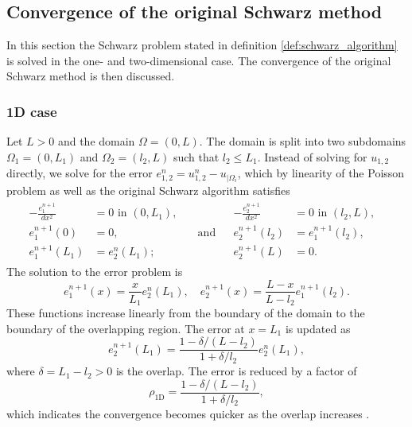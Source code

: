 \subsection{Convergence of the original Schwarz method} \label{sec:schwarz_convergence}
In this section the Schwarz problem stated in definition \ref{def:schwarz_algorithm} is solved in the one- and two-dimensional case. The convergence of the original Schwarz method is then discussed.

\subsubsection{1D case}
Let $L>0$ and the domain $\Omega = (0,L)$. The domain is split into two subdomains $\Omega_1 = (0,L_1)$ and $\Omega_2 = (l_2,L)$ such that $l_2\leq L_1$. Instead of solving for $u_{1,2}$ directly, we solve for the error $e^n_{1,2} = u^{n}_{1,2} - u_{|\Omega_i}$, which by linearity of the Poisson problem as well as the original Schwarz algorithm satisfies
\[
    \begin{array}{cc}
        \begin{aligned}
            -\frac{e_1^{n+1}}{d x^2} & = 0           \text { in } (0,L_1), &                   \\
            e_1^{n+1}(0)             & = 0,                                & \quad \text{and} \\
            e_1^{n+1}(L_1)           & = e_2^n(L_1);                       &
        \end{aligned} &
        \begin{aligned}
            -\frac{e_2^{n+1}}{d x^2} & = 0                \text { in } (l_2, L), & \\
            e_2^{n+1}(l_2)           & = e_1^{n+1}(l_2),                         & \\
            e_2^{n+1}(L)             & = 0.                                      &
        \end{aligned}
    \end{array}
\]
The solution to the error problem is
\[
    e_1^{n+1}(x) = \frac{x}{L_1}e_2^n(L_1), \quad e_2^{n+1}(x) = \frac{L-x}{L - l_2}e_1^{n+1}(l_2).
\]
These functions increase linearly from the boundary of the domain to the boundary of the overlapping region. The error at $x = L_1$ is updated as
\[
    e_2^{n+1}(L_1) = \frac{1 - \delta/(L-l_2)}{1 + \delta/l_2} e_2^n(L_1),
\]
where $\delta = L_1 - l_2 > 0 $ is the overlap. The error is reduced by a factor of
\begin{equation}
    \rho_{\text{1D}} = \frac{1 - \delta/(L-l_2)}{1 + \delta/l_2},
    \label{eq:1D_Schwarz_convergence}
\end{equation}
which indicates the convergence becomes quicker as the overlap increases \cite[Section 1.5.1]{schwarz_methods_Dolean_2015}.

